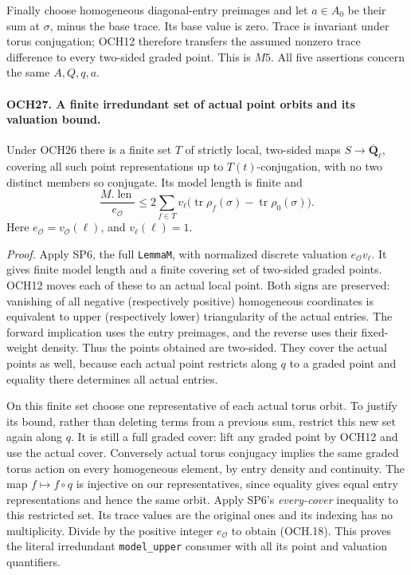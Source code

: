 Finally choose homogeneous diagonal-entry preimages and let
\(a\in A_0\) be their sum at \(\sigma\), minus the base
trace.  Its base value is zero.  Trace is invariant under torus
conjugation; OCH12 therefore transfers the assumed nonzero trace
difference to every two-sided graded point.  This is \(M5\).
All five assertions concern the same \(A,Q,q,a\).

\paragraph{OCH27. A finite irredundant set of actual point orbits and its valuation bound.}
\label{claim:OCH27}
Under OCH26 there is a finite set \(T\) of strictly local,
two-sided maps \(S\to\overline{\mathbf Q}_\ell\), covering
all such point representations up to \(T(t)\)-conjugation,
with no two distinct members so conjugate.  Its model length is
finite and
\[
 \frac{M.\operatorname{len}}{e_{\mathcal O}}
       \le2\sum_{f\in T}v_\ell
        \bigl(\operatorname{tr}\rho_f(\sigma)
                    -\operatorname{tr}\rho_0(\sigma)\bigr).
 \tag{OCH.18}
\]
Here \(e_{\mathcal O}=v_{\mathcal O}(\ell)\), and
\(v_\ell(\ell)=1\).

\emph{Proof.}
Apply SP6, the full \texttt{LemmaM}, with normalized discrete
valuation \(e_{\mathcal O}v_\ell\).  It gives finite model
length and a finite covering set of two-sided graded points.
OCH12 moves each of these to an actual local point.  Both signs
are preserved: vanishing of all negative (respectively positive)
homogeneous coordinates is equivalent to upper (respectively lower)
triangularity of the actual entries.  The forward implication uses
the entry preimages, and the reverse uses their fixed-weight density.
Thus the points obtained are two-sided.  They cover the actual
points as well, because each actual point restricts along \(q\)
to a graded point and equality there determines all actual entries.

On this finite set choose one representative of each actual torus
orbit.  To justify its bound, rather than deleting terms from a
previous sum, restrict this new set again along \(q\).
It is still a full graded cover: lift any graded point by OCH12
and use the actual cover.  Conversely actual torus conjugacy
implies the same graded torus action on every homogeneous element,
by entry density and continuity.  The map \(f\mapsto f\circ q\)
is injective on our representatives, since equality gives equal
entry representations and hence the same orbit.  Apply SP6's
\emph{every-cover} inequality to this restricted set.  Its trace
values are the original ones and its indexing has no multiplicity.
Divide by the positive integer \(e_{\mathcal O}\) to obtain
(OCH.18).  This proves the literal irredundant \texttt{model\_upper}
consumer with all its point and valuation quantifiers.

